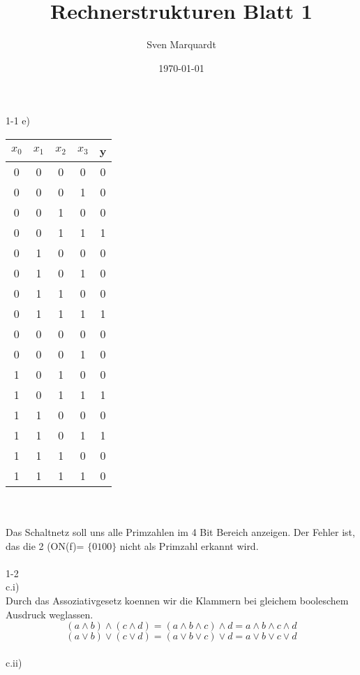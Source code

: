 \documentclass[11pt,a4paper]{article}
\title{Rechnerstrukturen Blatt 1}
\author{Sven Marquardt}
\date{\today}
\begin{document}
1-1 e)
\\
\begin{tabular}{c | c | c | c | c}
$x_0$ & $x_1$ & $x_2$& $x_3$ & y \\ \hline
0&0&0&0&0\\
0&0&0&1&0\\ \hline
0&0&1&0&0\\ \hline
0&0&1&1&1\\ \hline
0&1&0&0&0\\
0&1&0&1&0\\
0&1&1&0&0\\
0&1&1&1&1\\ \hline
0&0&0&0&0\\
0&0&0&1&0\\
1&0&1&0&0\\
1&0&1&1&1\\ \hline
1&1&0&0&0\\
1&1&0&1&1\\
1&1&1&0&0\\
1&1&1&1&0\\
\end{tabular}
\\
\\
Das Schaltnetz soll uns alle Primzahlen im 4 Bit Bereich anzeigen. Der Fehler ist, das die 2 (ON(f)=
$\lbrace 0100 \rbrace$
nicht als Primzahl erkannt wird. \\ \\
1-2\\
c.i)\\
Durch das Assoziativgesetz  koennen wir die Klammern bei gleichem booleschem Ausdruck weglassen.
\begin{equation}
\label{Assoziativ1}
( a \wedge b) \wedge (c \wedge d) = (a \wedge b \wedge c) \wedge d=a \wedge b \wedge c \wedge d 
\end{equation}
\begin{equation}
( a \vee b)\vee (c \vee d)= (a \vee b \vee c) \vee d= a \vee b \vee c \vee d
\end{equation}
\\
c.ii)\\
\end{document}
